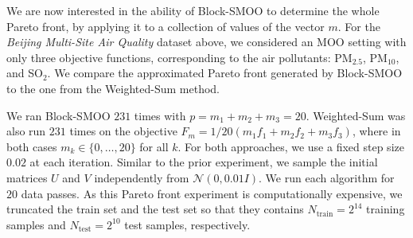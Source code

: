 \documentclass[11pt,a4paper]{article}
\numberwithin{equation}{section}%
\renewcommand{\(}{\left (}
\renewcommand{\)}{\right )}
\begin{document}
We are now interested in the ability of Block-SMOO to determine the whole Pareto front, by applying it to a collection of values of the vector $m$. For the \textit{Beijing Multi-Site Air Quality} dataset above, we considered an MOO setting with only three objective functions, corresponding to the air pollutants: PM$_{2.5}$, PM$_{10}$, and SO$_2$. We compare the approximated Pareto front generated by Block-SMOO to the one from the Weighted-Sum method. 

We ran Block-SMOO $231$ times with $p = m_1 + m_2 + m_3 = 20$. Weighted-Sum was also run $231$ times on the objective $F_m = 1/20(m_1 f_1 + m_2 f_2 + m_3 f_3)$, where in both cases $m_k \in \{0,\dots, 20\}$ for all $k$.
For both approaches, we use a fixed step size $0.02$ at each iteration. %
Similar to the prior experiment, we sample the initial matrices $U$ and $V$ independently from $\mathcal{N}(0, 0.01 I)$.
We run each algorithm for $20$ data passes. As this Pareto front experiment is computationally expensive, we truncated the train set and the test set so that they contains $N_{\mathrm{train}} = 2^{14}$ training samples and $N_{\mathrm{test}} = 2^{10}$ test samples, respectively. 
\end{document}
